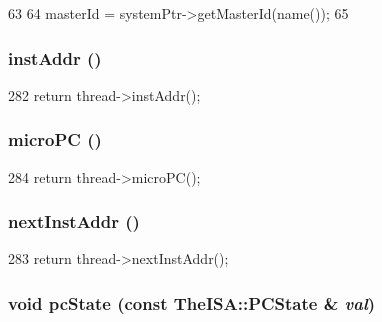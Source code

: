 \begin{DoxyCode}
63 {
64     masterId = systemPtr->getMasterId(name());
65 }
\end{DoxyCode}
\hypertarget{classCheckerCPU_a53c92716db281ae16ffb693c6d7803c7}{
\subsubsection[{instAddr}]{ instAddr ()}}
\label{classCheckerCPU_a53c92716db281ae16ffb693c6d7803c7}



\begin{DoxyCode}
282 { return thread->instAddr(); }
\end{DoxyCode}
\hypertarget{classCheckerCPU_a1a21696f33a7d38f251687ae0b5e9718}{
\subsubsection[{microPC}]{ microPC ()}}
\label{classCheckerCPU_a1a21696f33a7d38f251687ae0b5e9718}



\begin{DoxyCode}
284 { return thread->microPC(); }
\end{DoxyCode}
\hypertarget{classCheckerCPU_aceec6e28772f91b3cc921c0e3927b0c2}{
\subsubsection[{nextInstAddr}]{ nextInstAddr ()}}
\label{classCheckerCPU_aceec6e28772f91b3cc921c0e3927b0c2}



\begin{DoxyCode}
283 { return thread->nextInstAddr(); }
\end{DoxyCode}
\hypertarget{classCheckerCPU_a5e9cfc754c9ef9b7db875ce89871944e}{
\subsubsection[{pcState}]{\setlength{\rightskip}{0pt plus 5cm}void pcState (const TheISA::PCState \& {\em val})}}
\label{classCheckerCPU_a5e9cfc754c9ef9b7db875ce89871944e}



